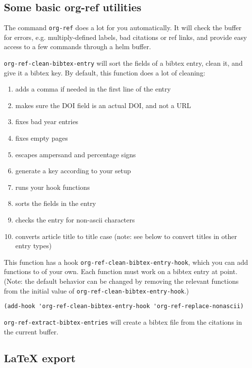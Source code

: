 \documentclass[11pt]{article}
\begin{document}
\subsection{Some basic org-ref utilities}
\label{sec:org5649f4b}

The command \texttt{org-ref} does a lot for you automatically. It will check the buffer for errors, e.g. multiply-defined labels, bad citations or ref links, and provide easy access to a few commands through a helm buffer.

\texttt{org-ref-clean-bibtex-entry} will sort the fields of a bibtex entry, clean it, and give it a bibtex key. By default, this function does a lot of cleaning:

\begin{enumerate}
\item adds a comma if needed in the first line of the entry
\item makes sure the DOI field is an actual DOI, and not a URL
\item fixes bad year entries
\item fixes empty pages
\item escapes ampersand and percentage signs
\item generate a key according to your setup
\item runs your hook functions
\item sorts the fields in the entry
\item checks the entry for non-ascii characters
\item converts article title to title case (note: see below to convert titles in other entry types)
\end{enumerate}

This function has a hook \texttt{org-ref-clean-bibtex-entry-hook}, which you can add functions to of your own. Each function must work on a bibtex entry at point. (Note: the default behavior can be changed by removing the relevant functions from the initial value of \texttt{org-ref-clean-bibtex-entry-hook}.)

\begin{verbatim}
(add-hook 'org-ref-clean-bibtex-entry-hook 'org-ref-replace-nonascii)
\end{verbatim}

\texttt{org-ref-extract-bibtex-entries} will create a bibtex file from the citations in the current buffer.

\subsection{\LaTeX{} export}
\label{sec:org043191e}
\end{document}
